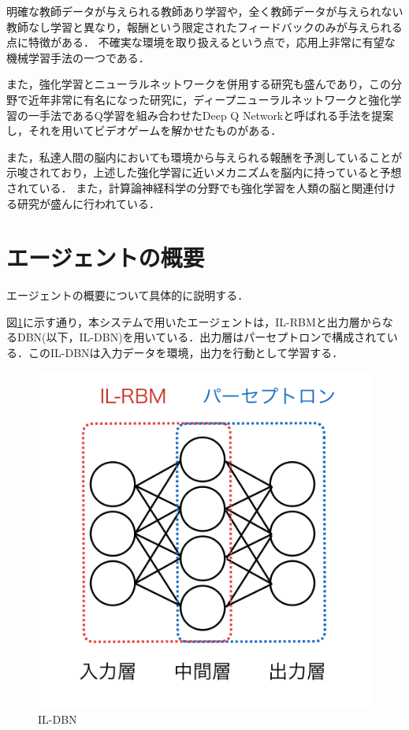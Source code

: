 明確な教師データが与えられる教師あり学習や，全く教師データが与えられない教師なし学習と異なり，報酬という限定されたフィードバックのみが与えられる点に特徴がある．
不確実な環境を取り扱えるという点で，応用上非常に有望な機械学習手法の一つである．

また，強化学習とニューラルネットワークを併用する研究も盛んであり，この分野で近年非常に有名になった研究に，ディープニューラルネットワークと強化学習の一手法であるQ学習\cite{watkins1992q}を組み合わせたDeep Q Networkと呼ばれる手法を提案し，それを用いてビデオゲームを解かせたものがある\cite{mnih2013playing}．

また，私達人間の脳内においても環境から与えられる報酬を予測していることが示唆されており\cite{schultz1997neural}，上述した強化学習に近いメカニズムを脳内に持っていると予想されている\cite{銅谷}．
また，計算論神経科学の分野でも強化学習を人類の脳と関連付ける研究が盛んに行われている\cite{lee2012neural,izhikevich2007solving,maia2011reinforcement}．



\section{エージェントの概要}
エージェントの概要について具体的に説明する．

図\ref{fig:ildbn}に示す通り，本システムで用いたエージェントは，IL-RBMと出力層からなるDBN(以下，IL-DBN)を用いている．出力層はパーセプトロンで構成されている．このIL-DBNは入力データを環境，出力を行動として学習する．

\begin{figure}[tb]
 \begin{center}
  \includegraphics[scale=0.6]{./koki/ildbn.png}
  \caption{IL-DBN}
  \label{fig:ildbn}
 \end{center}
\end{figure}


